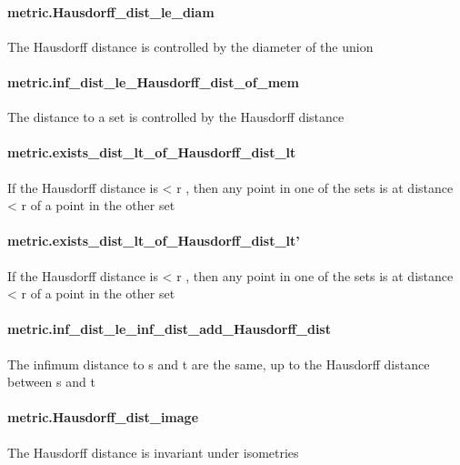 \documentclass{article}
\begin{document}
\paragraph{metric.Hausdorff\_dist\_le\_diam}
\par
The Hausdorff distance is controlled by the diameter of the union
\paragraph{metric.inf\_dist\_le\_Hausdorff\_dist\_of\_mem}
\par
The distance to a set is controlled by the Hausdorff distance
\paragraph{metric.exists\_dist\_lt\_of\_Hausdorff\_dist\_lt}
\par
If the Hausdorff distance is 
\colorbox[RGB]{253,246,227}{{{{\color[RGB]{181, 137, 0} < }}}{{{\color[RGB]{101, 123, 131} r }}}}, then any point in one of the sets is at distance
\colorbox[RGB]{253,246,227}{{{{\color[RGB]{181, 137, 0} < }}}{{{\color[RGB]{101, 123, 131} r }}}} of a point in the other set
\paragraph{metric.exists\_dist\_lt\_of\_Hausdorff\_dist\_lt'}
\par
If the Hausdorff distance is 
\colorbox[RGB]{253,246,227}{{{{\color[RGB]{181, 137, 0} < }}}{{{\color[RGB]{101, 123, 131} r }}}}, then any point in one of the sets is at distance
\colorbox[RGB]{253,246,227}{{{{\color[RGB]{181, 137, 0} < }}}{{{\color[RGB]{101, 123, 131} r }}}} of a point in the other set
\paragraph{metric.inf\_dist\_le\_inf\_dist\_add\_Hausdorff\_dist}
\par
The infimum distance to 
\colorbox[RGB]{253,246,227}{{{{\color[RGB]{101, 123, 131} s }}}} and 
\colorbox[RGB]{253,246,227}{{{{\color[RGB]{101, 123, 131} t }}}} are the same, up to the Hausdorff distance
between 
\colorbox[RGB]{253,246,227}{{{{\color[RGB]{101, 123, 131} s }}}} and 
\colorbox[RGB]{253,246,227}{{{{\color[RGB]{101, 123, 131} t }}}}\paragraph{metric.Hausdorff\_dist\_image}
\par
The Hausdorff distance is invariant under isometries
\end{document}
